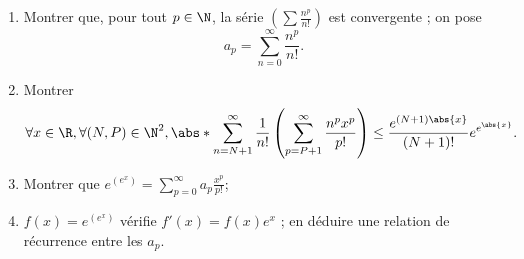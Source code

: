 \begin{enonce}
\begin{exercise}[ID={cahierRMS 5, 126, Centrale},subtitle={},tags={}]
\begin{enumerate}
\item
  Montrer que, pour tout $p\in\N$, la série $\left( \sum\frac{n^p}{n!} \right)$ est convergente ; on pose
  \begin{equation*}
    a_p = \sum_{n=0}^\infty \frac{n^p}{n!}.
  \end{equation*}
\item Montrer
  \begin{equation*}
    \forall x\in\R, \forall(N,P)\in\N^2, 
    \abs*{\sum_{n=N+1}^{\infty} \frac 1{n!} \left( \sum_{p=P+1}^{\infty} \frac{n^px^p}{p!} \right)}
    \leq 
    \frac{e^{(N+1)\abs{x}}}{(N+1)!} e^{e^{\abs{x}}}.
  \end{equation*}
\item Montrer que $e^{\left( e^x \right)} = \sum_{p=0}^{\infty} a_p \frac{x^p}{p!}$;
\item $f(x) = e^{\left( e^x \right)}$ vérifie $f'(x) = f(x) e^x$ ; en déduire une relation de récurrence entre les $a_p$.
\end{enumerate}
\end{exercise}
\begin{solution}
\end{solution}
\end{enonce}
